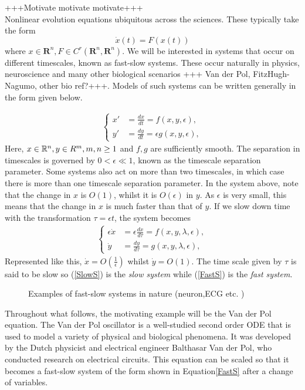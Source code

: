 +++Motivate motivate motivate+++\\
Nonlinear evolution equations ubiquitous across the sciences. These typically take the form
$$ \dot{x}(t) = F\left(x(t)\right)$$ where $x\in \mathbf{R}^n, F\in C^r(\mathbf{R}^n,\mathbf{R}^n)$. We will be interested in systems that occur on different timescales, known as fast-slow systems. These occur naturally in physics, neuroscience and many other biological scenarios +++ Van der Pol, FitzHugh-Nagumo, other bio ref?+++. Models of such systems can be written generally in the form given below.

\begin{align}
\begin{cases}
x' &=\frac{dx}{dt}= f(x,y,\epsilon),\\
y' &= \frac{dy}{dt}= \epsilon g(x,y,  \epsilon),
\end{cases}\label{FastS}
\end{align} 
Here, $x \in \mathbb{R}^n, y \in R^m, m,n \geq 1$ and $f,g$ are sufficiently smooth. The separation in timescales is governed by $0<\epsilon \ll 1$, known as the timescale separation parameter. Some systems also act on more than two timescales, in which case there is more than one timescale separation parameter.  In the system above, note that the change in $x$ is $O(1)$, whilst it is $O(\epsilon)$ in $y$. As $\epsilon$ is very small, this means that the change in $x$ is much faster than that of $y$. If we slow down time with the transformation $\tau = \epsilon t$, the system becomes  
\begin{align}
	\begin{cases}
	\epsilon \dot{x} &= \epsilon \frac{dx}{d\tau} = f(x,y,\lambda, \epsilon),\\
	\dot{y} & = \frac{dy}{d \tau} =  g( x,y, \lambda, \epsilon),
	\end{cases}\label{SlowS}
\end{align} 
Represented like this, $\dot{x} = O(\frac{1}{\epsilon})$ whilst $\dot{y} = O(1)$.  The time scale given by $\tau$ is said to be slow so (\ref{SlowS}) is the \emph{slow system} while (\ref{FastS}) is the \emph{fast system}.


\begin{figure}[]
	\caption{Examples of fast-slow systems in nature (neuron,ECG etc. )}
	\label{fig:nature}
\end{figure} 


Throughout what follows, the motivating example will be the Van der Pol equation. The Van der Pol oscillator is a well-studied second order ODE that is used to model a variety of physical and biological phenomena. It was developed by the Dutch physicist and electrical engineer Balthasar Van der Pol, who conducted research on electrical circuits. This equation can be scaled so that it becomes a fast-slow system of the form shown in Equation\ref{FastS} after a change of variables.

